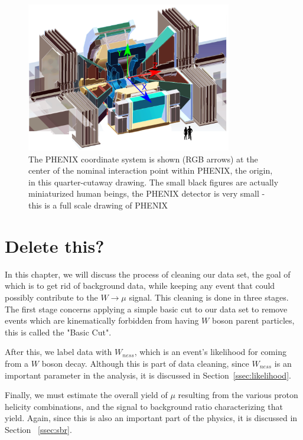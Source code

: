 \begin{figure}
  \centering
  \includegraphics[width=0.8\textwidth]{./figures/phenix_coordinate_system.png}
  \caption{
    The PHENIX coordinate system is shown (RGB arrows) at the center of the
    nominal interaction point within PHENIX, the origin, in this quarter-cutaway
    drawing. The small black figures are actually miniaturized human beings, the
    PHENIX detector is very small - this is a full scale drawing of 
    PHENIX~\cite{WebPHENIXDrawings}
  }
  \label{fig:phenix_coordinate_system}

\end{figure}

\clearpage
\section{Delete this?}

In this chapter, we will discuss the process of cleaning our data set, the goal
of which is to get rid of background data, while keeping any event that could
possibly contribute to the $W\rightarrow\mu$ signal. This cleaning is done in
three stages. The first stage concerns applying a simple basic cut to our data
set to remove events which are kinematically forbidden from having $W$ boson
parent particles, this is called the "Basic Cut".

After this, we label data with $W_{ness}$, which is an event's likelihood for
coming from a $W$ boson decay. Although this is part of data cleaning, since
$W_{ness}$ is an important parameter in the analysis, it is discussed in
Section~\ref{ssec:likelihood}.

Finally, we must estimate the overall yield of $\mu$ resulting from the various
proton helicity combinations, and the signal to background ratio characterizing
that yield. Again, since this is also an important part of the physics, it is
discussed in Section ~\ref{ssec:sbr}.

